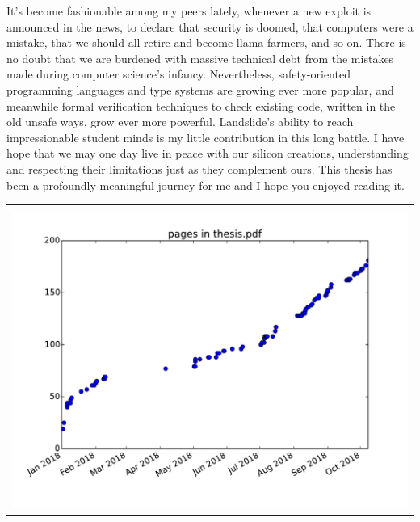 \documentclass[12pt]{cmuthesis}
\begin{document}
It's become fashionable among my peers lately,
whenever a new exploit is announced in the news,
to declare that security is doomed,
that computers were a mistake,
that we should all retire and become llama farmers,
and so on.
There is no doubt that we are burdened with massive technical debt from the mistakes made
during computer science's infancy.
Nevertheless,
safety-oriented programming languages and type systems are growing ever more popular,
and meanwhile formal verification techniques to check existing code,
written in the old unsafe ways, grow ever more powerful.
Landslide's ability to reach impressionable student minds is my little contribution in this long battle.
I have hope that we may one day live in peace with our silicon creations,
understanding and respecting their limitations just as they complement ours.
This thesis has been a profoundly meaningful journey for me and I hope you enjoyed reading it.

\newpage
\thispagestyle{empty}
\begin{center}
\begin{tabular}{c}
\vspace{12em} \\
\includegraphics[width=\textwidth]{pages.pdf}
\end{tabular}
\end{center}

%
\end{document}
